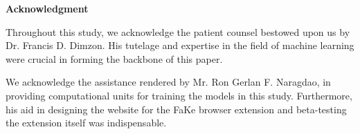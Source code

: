 \begin{center}
	\textbf{Acknowledgment}
\end{center}

Throughout this study, we acknowledge the patient counsel bestowed upon us by Dr. Francis D. Dimzon. His tutelage and expertise in the field of machine learning were crucial in forming the backbone of this paper.

We acknowledge the assistance rendered by Mr. Ron Gerlan F. Naragdao, in providing computational units for training the models in this study. Furthermore, his aid in designing the website for the FaKe browser extension and beta-testing the extension itself was indispensable.
